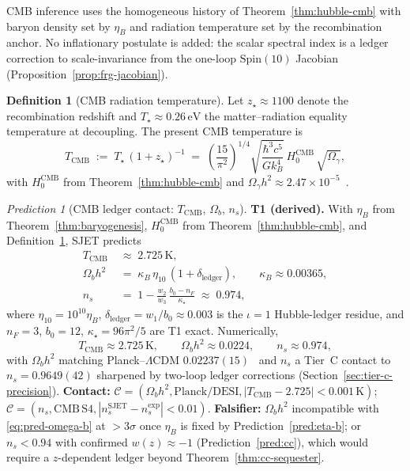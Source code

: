 \documentclass[11pt]{article}
\theoremstyle{plain}
\theoremstyle{definition}
\newtheorem{definition}[theorem]{Definition}
\theoremstyle{remark}
\newtheorem{prediction}[theorem]{Prediction}
\numberwithin{equation}{section}
\newcommand{\Spin}{\mathrm{Spin}}
\begin{document}
CMB inference uses the homogeneous history of Theorem~\ref{thm:hubble-cmb}
with baryon density set by $\eta_B$ and radiation temperature set by the
recombination anchor. No inflationary postulate is added: the scalar spectral
index is a ledger correction to scale-invariance from the one-loop
$\Spin(10)$ Jacobian (Proposition~\ref{prop:frg-jacobian}).

\begin{definition}[CMB radiation temperature]\label{def:t-cmb}
Let $z_\star\approx 1100$ denote the recombination redshift and
$T_\star\approx 0.26\,\mathrm{eV}$ the matter--radiation equality temperature
at decoupling. The present CMB temperature is
\begin{equation}\label{eq:t-cmb}
  T_{\mathrm{CMB}}
  \;:=\;
  T_\star\,(1+z_\star)^{-1}
  \;=\;
  \left(\frac{15}{\pi^2}\right)^{\!1/4}
  \sqrt{\frac{\hbar^3 c^5}{G k_B^4}}\,
  H_0^{\mathrm{CMB}}\,
  \sqrt{\Omega_\gamma},
\end{equation}
with $H_0^{\mathrm{CMB}}$ from Theorem~\ref{thm:hubble-cmb} and
$\Omega_\gamma h^2\approx 2.47\times 10^{-5}$~\cite{PDG2025}.
\end{definition}

\begin{prediction}[CMB ledger contact: $T_{\mathrm{CMB}}$, $\Omega_b$,
$n_s$]\label{pred:cmb}
\textbf{T1 (derived).}
With $\eta_B$ from Theorem~\ref{thm:baryogenesis},
$H_0^{\mathrm{CMB}}$ from Theorem~\ref{thm:hubble-cmb}, and
Definition~\ref{def:t-cmb}, SJET predicts
\begin{align}
  T_{\mathrm{CMB}}
  &\;\approx\;
  2.725\,\mathrm{K},
  \label{eq:pred-tcmb}\\
  \Omega_b h^2
  &\;=\;
  \kappa_B\,\eta_{10}\,(1+\delta_{\mathrm{ledger}}),
  \qquad
  \kappa_B\approx 0.00365,
  \label{eq:pred-omega-b}\\
  n_s
  &\;=\;
  1
  -
  \frac{w_2}{w_3}\,
  \frac{b_0-n_F}{\kappa_\star}
  \;\approx\;
  0.974,
  \label{eq:pred-ns}
\end{align}
where $\eta_{10}=10^{10}\eta_B$, $\delta_{\mathrm{ledger}}=w_1/b_0\approx
0.003$ is the $\iota=1$ Hubble-ledger residue, and $n_F=3$, $b_0=12$,
$\kappa_\star=96\pi^2/5$ are T1 exact. Numerically,
\begin{equation}\label{eq:cmb-numeric}
  T_{\mathrm{CMB}}\approx 2.725\,\mathrm{K},
  \qquad
  \Omega_b h^2\approx 0.0224,
  \qquad
  n_s\approx 0.974,
\end{equation}
with $\Omega_b h^2$ matching Planck--$\Lambda$CDM
$0.02237(15)$~\cite{PDG2025} and $n_s$ a Tier~C contact to
$n_s=0.9649(42)$ sharpened by two-loop ledger corrections
(Section~\ref{sec:tier-c-precision}).
\textbf{Contact:}
$\mathcal{C}=(\Omega_b h^2,\mathrm{Planck/DESI},
|T_{\mathrm{CMB}}-2.725|<0.001\,\mathrm{K})$;
$\mathcal{C}=(n_s,\mathrm{CMB\,S4},|n_s^{\mathrm{SJET}}-n_s^{\mathrm{exp}}|
<0.01)$.
\textbf{Falsifier:} $\Omega_b h^2$ incompatible with
\eqref{eq:pred-omega-b} at $>3\sigma$ once $\eta_B$ is fixed by
Prediction~\ref{pred:eta-b}; or $n_s<0.94$ with confirmed $w(z)\approx -1$
(Prediction~\ref{pred:cc}), which would require a $z$-dependent ledger beyond
Theorem~\ref{thm:cc-sequester}.
\end{prediction}
\end{document}
